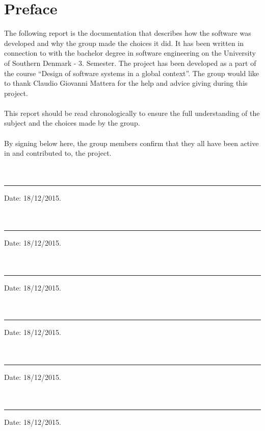 
\section{Preface}
The following report is the documentation that describes how the software was developed and why the group made the choices it did. It has been written in connection to with the bachelor degree in software engineering on the University of Southern Denmark - 3. Semester. The project has been developed as a part of the course “Design of software systems in a global context”. The group would like to thank Claudio Giovanni Mattera for the help and advice giving during this project.
\\
\\
This report should be read chronologically to ensure the full understanding of the subject and the choices made by the group.
\\
\\
By signing below here, the group members confirm that they all have been active in and contributed to, the project.
\\
\\
\\

\noindent\rule{10cm}{0.4pt}                                                                  Date: 18/12/2015.
\\
\\
\\
\noindent\rule{10cm}{0.4pt}                                                                 Date: 18/12/2015.
\\
\\
\\
\noindent\rule{10cm}{0.4pt}                                                                 Date: 18/12/2015.
\\
\\
\\
\noindent\rule{10cm}{0.4pt}                                                                 Date: 18/12/2015.
\\
\\
\\
\noindent\rule{10cm}{0.4pt}                                                                 Date: 18/12/2015.
\\
\\
\\
\noindent\rule{10cm}{0.4pt}                                                                 Date: 18/12/2015.
